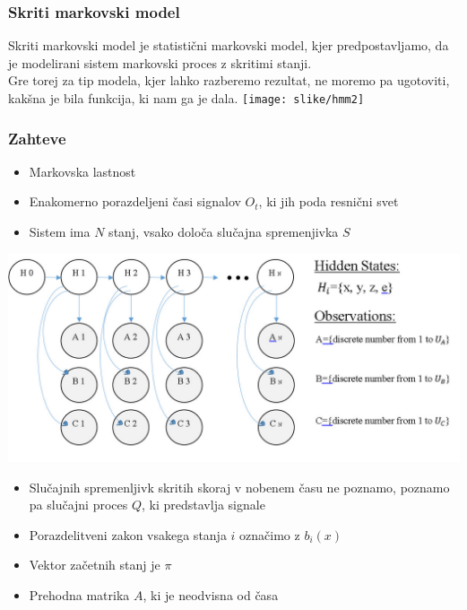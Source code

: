 \documentclass{beamer} %
\begin{document}
\begin{frame}
\frametitle{Skriti markovski model}
Skriti markovski model je statistični markovski model, kjer predpostavljamo, da je modelirani sistem markovski proces z skritimi stanji.\\
Gre torej za tip modela, kjer lahko razberemo rezultat, ne moremo pa ugotoviti, kakšna je bila funkcija, ki nam ga je dala. 
\texttt{[image: slike/hmm2]} 
\end{frame}

\begin{frame}
\frametitle{Zahteve}
\begin{itemize}
	\item Markovska lastnost
	\item Enakomerno porazdeljeni časi signalov $O_{t}$, ki jih poda resnični svet
	\item Sistem ima $N$ stanj, vsako določa slučajna spremenjivka $S$
\end{itemize}
\includegraphics[scale=0.25]{slike/hmm}
\end{frame}

\begin{frame}
\begin{itemize}
	\item Slučajnih spremenljivk skritih skoraj v nobenem času ne poznamo, poznamo pa slučajni proces $Q$, ki predstavlja signale
	\item Porazdelitveni zakon vsakega stanja $i$ označimo z $b_{i}(x)$
	\item Vektor začetnih stanj je $\pi$
	\item Prehodna matrika $A$, ki je neodvisna od časa
\end{itemize}
\end{frame}
\end{document}
